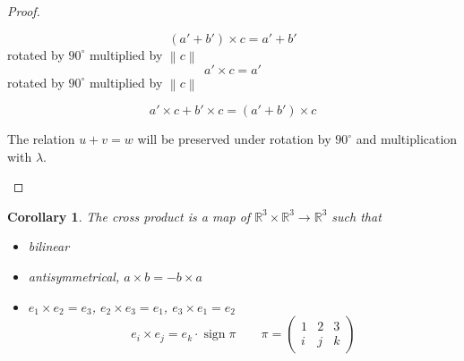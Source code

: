 \documentclass{article}
\newtheorem*{corollary}{Corollary}%
\newcommand{\norm}[1]{\left\|#1\right\|}
\DeclareMathOperator{\sign}{sign}
\begin{document}
\begin{proof}
\begin{itemize}
\begin{enumerate}
          \[ (a' + b') \times c = a' + b' \]
          rotated by $90^\circ$ multiplied by $\norm{c}$
          \[ a' \times c = a' \]
          rotated by $90^\circ$ multiplied by $\norm{c}$

          \[ a' \times c + b' \times c = (a' + b') \times c \]

          The relation $u + v = w$ will be preserved under rotation by $90^\circ$ and multiplication with $\lambda$.
      \end{enumerate}
  \end{itemize}
\end{proof}

\begin{corollary} %
  The cross product is a map of $\mathbb R^3 \times \mathbb R^3 \to \mathbb R^3$
  such that
  \begin{itemize}
    \item bilinear
    \item antisymmetrical, $a \times b = -b \times a$
    \item $e_1 \times e_2 = e_3$, $e_2 \times e_3 = e_1$, $e_3 \times e_1 = e_2$
      \[ e_i \times e_j = e_k \cdot \sign{\pi} \qquad \pi = \begin{pmatrix} 1 & 2 & 3 \\ i & j & k \end{pmatrix} \]
  \end{itemize}
\end{corollary}
\end{document}
